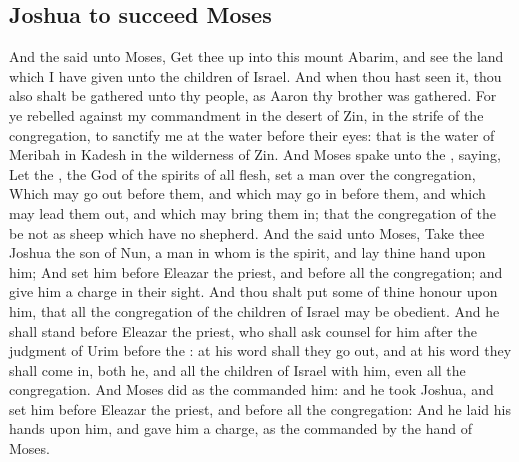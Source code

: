 \begin{biblechapter}
\section*{Joshua to succeed Moses}
\verse And the \LORD said unto Moses, Get thee up into this mount Abarim, and see the land which I have given unto the children of Israel.
\verse And when thou hast seen it, thou also shalt be gathered unto thy people, as Aaron thy brother was gathered.
\verse For ye rebelled against my commandment in the desert of Zin, in the strife of the congregation, to sanctify me at the water before their eyes: that is the water of Meribah in Kadesh in the wilderness of Zin.
\verse And Moses spake unto the \LORD, saying,
\verse Let the \LORD, the God of the spirits of all flesh, set a man over the congregation,
\verse Which may go out before them, and which may go in before them, and which may lead them out, and which may bring them in; that the congregation of the \LORD be not as sheep which have no shepherd.
\verse And the \LORD said unto Moses, Take thee Joshua the son of Nun, a man in whom is the spirit, and lay thine hand upon him;
\verse And set him before Eleazar the priest, and before all the congregation; and give him a charge in their sight.
\verse And thou shalt put some of thine honour upon him, that all the congregation of the children of Israel may be obedient.
\verse And he shall stand before Eleazar the priest, who shall ask counsel for him after the judgment of Urim before the \LORD: at his word shall they go out, and at his word they shall come in, both he, and all the children of Israel with him, even all the congregation.
\verse And Moses did as the \LORD commanded him: and he took Joshua, and set him before Eleazar the priest, and before all the congregation:
\verse And he laid his hands upon him, and gave him a charge, as the \LORD commanded by the hand of Moses.
\end{biblechapter}

